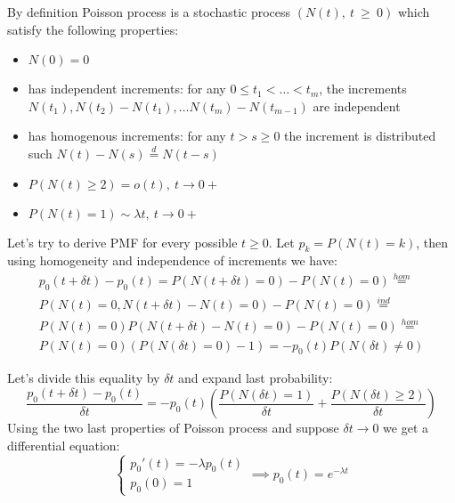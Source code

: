 \documentclass[a4paper, 12pt]{article}
\newcommand{\rbra}[1]{\left( #1 \right)}
\begin{document}
\begin{enumerate}
\begin{enumerate}
              {
                  By definition Poisson process is a stochastic process $(N(t),~t~\geq~0)$ which
                  satisfy the following properties:
                  \begin{itemize}
                      \item $N(0) = 0$
                      \item has independent increments: for any $0 \leq t_1 < \dots < t_m$, the increments
                            $N(t_1), N(t_2) - N(t_1), \dots N(t_m) - N(t_{m-1}) $ are independent
                      \item has homogenous increments: for any $t > s \geq 0$ the increment is
                            distributed such $N(t) - N(s) \stackrel{d}{=} N(t-s)$
                      \item $P(N(t) \geq 2) = o(t),\ t\rightarrow 0+$
                      \item $P(N(t) = 1) \sim \lambda t,\ t\rightarrow 0+$
                  \end{itemize}

                  Let's try to derive PMF for every possible $t \geq 0$. Let $p_k = P(N(t) = k)$, then
                  using homogeneity and independence of increments we have:
                  \begin{multline*}
                      p_0(t + \delta t) - p_0(t) = P(N(t+ \delta t) = 0) - P(N(t) = 0) \stackrel{hom}{=} \\
                      P(N(t) = 0, N(t + \delta t) - N(t) = 0) - P(N(t) = 0) \stackrel{ind}{=} \\
                      P(N(t) = 0) P(N(t + \delta t) - N(t) = 0) - P(N(t) = 0) \stackrel{hom}{=} \\
                      P(N(t) = 0) \rbra{P(N(\delta t) = 0) - 1} = -p_0(t) P(N(\delta t) \neq 0)
                  \end{multline*}

                  Let's divide this equality by $\delta t$ and expand last probability:
                  \[
                      \frac{p_0(t + \delta t) - p_0(t)}{\delta t} = -p_0(t)
                      \rbra{\frac{P(N(\delta t) = 1)}{\delta t} +
                          \frac{P(N(\delta t) \geq 2)}{\delta t} }
                  \]
                  Using the two last properties of Poisson process and suppose $\delta t \rightarrow 0$ we
                  get a differential equation:
                  \[
                      \begin{cases}
                          p_0'(t) = - \lambda p_0(t) \\
                          p_0(0) = 1
                      \end{cases} \implies
                      p_0(t) = e^{-\lambda t}
                  \]

}
\end{enumerate}
\end{enumerate}
\end{document}
